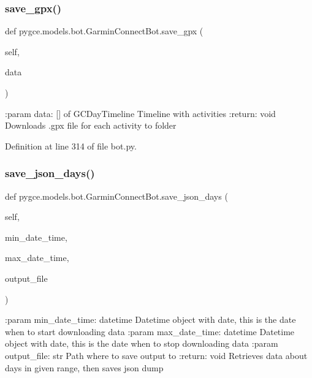 \subsubsection{\texorpdfstring{save\+\_\+gpx()}{save\_gpx()}}
{\footnotesize\ttfamily def pygce.\+models.\+bot.\+Garmin\+Connect\+Bot.\+save\+\_\+gpx (\begin{DoxyParamCaption}\item[{}]{self,  }\item[{}]{data }\end{DoxyParamCaption})}

\begin{DoxyVerb}:param data: [] of GCDayTimeline
    Timeline with activities
:return: void
    Downloads .gpx file for each activity to folder
\end{DoxyVerb}
 

Definition at line 314 of file bot.\+py.

\mbox{\label{classpygce_1_1models_1_1bot_1_1_garmin_connect_bot_a6b7760e4013e2ada06bed1a5f47133f1}} 
\subsubsection{\texorpdfstring{save\+\_\+json\+\_\+days()}{save\_json\_days()}}
{\footnotesize\ttfamily def pygce.\+models.\+bot.\+Garmin\+Connect\+Bot.\+save\+\_\+json\+\_\+days (\begin{DoxyParamCaption}\item[{}]{self,  }\item[{}]{min\+\_\+date\+\_\+time,  }\item[{}]{max\+\_\+date\+\_\+time,  }\item[{}]{output\+\_\+file }\end{DoxyParamCaption})}

\begin{DoxyVerb}:param min_date_time: datetime
    Datetime object with date, this is the date when to start downloading data
:param max_date_time: datetime
    Datetime object with date, this is the date when to stop downloading data
:param output_file: str
    Path where to save output to
:return: void
    Retrieves data about days in given range, then saves json dump
\end{DoxyVerb}
 


